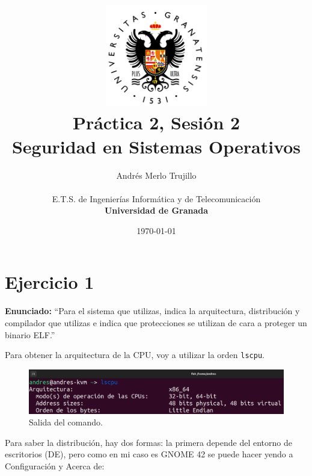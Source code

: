 \documentclass{article}
\title{
\includegraphics[width=1.75in]{imagenes/UGR-Logo.png} \\
\vspace*{1in}
\textbf{Práctica 2, Sesión 2} \\
Seguridad en Sistemas Operativos \\
\vspace*{0.5in}}
\author{Andrés Merlo Trujillo \\
\vspace*{0.5in} \\
E.T.S. de Ingenierías Informática y de Telecomunicación \\
\textbf{Universidad de Granada}} \date{\today}
\begin{document}
\begin{titlingpage}
    \maketitle
\end{titlingpage}

\tableofcontents

\newpage

\pagestyle{fancy}


{}
\section*{Ejercicio 1}

\textbf{Enunciado: }``Para el sistema que utilizas, indica la arquitectura, distribución y compilador que utilizas e indica que protecciones se utilizan de cara a proteger un binario ELF.''

\bigskip

Para obtener la arquitectura de la CPU, voy a utilizar la orden \verb|lscpu|.

\begin{figure}[H]
    \includegraphics[width=\textwidth]{imagenes/Captura desde 2022-11-23 10-33-11.png}
    \caption{Salida del comando.}
\end{figure}

\bigskip

Para saber la distribución, hay dos formas: la primera depende del entorno de escritorios (DE), pero como en mi caso es GNOME 42 se puede hacer yendo a Configuración y Acerca de:
\end{document}
